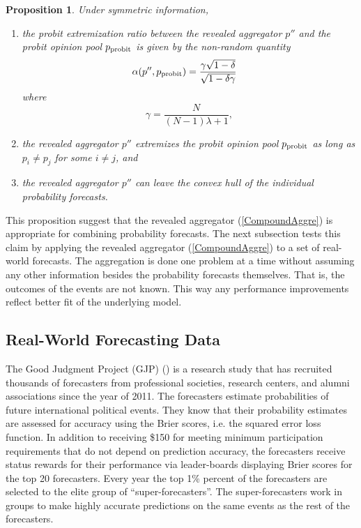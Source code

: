 \documentclass[11pt]{article}
\newtheorem{proposition}[theorem]{Proposition}
\theoremstyle{definition}
\theoremstyle{definition}
\def\probit{p_{\rm probit}}
\begin{document}
\begin{proposition} \label{positiveThm}
Under symmetric information, 
\begin{enumerate}
\item[$(i)$] the probit extremization ratio between the revealed
aggregator $p''$ and the probit opinion pool $\probit$ is given by the
non-random quantity
\begin{align*}
\alpha(p'', \probit)
 &=  \frac{\gamma \sqrt{1 - \delta}}{\sqrt{1-\delta\gamma}}
\end{align*}
where
$$\gamma = \frac{N}{(N-1)\lambda +1},$$
\item[$(ii)$] the revealed aggregator $p''$ extremizes the probit
opinion pool $\probit$ as long as $p_i \neq p_j$ for some $i \neq j$,
and
\item[$(iii)$] the revealed aggregator $p''$ can leave the convex hull
of the individual probability forecasts.
\end{enumerate}
\end{proposition}
This proposition suggest that the revealed aggregator
(\ref{CompoundAggre}) is appropriate for combining probability
forecasts. The next subsection tests this claim by applying the revealed aggregator (\ref{CompoundAggre}) to a set
of real-world forecasts. The aggregation is done one problem at a time
without assuming any other information besides the probability
forecasts themselves. That is, the outcomes of the events are not
known. This way any performance improvements reflect better fit of the
underlying model.



\subsection{Real-World Forecasting Data}
\label{realData}
The Good Judgment Project (GJP) (\citealt{mellers2014psychological,
ungar2012good}) is a research study that has recruited
thousands of forecasters from professional societies, research
centers, and alumni associations since the year of 2011.  The forecasters estimate
probabilities of future international political events.  They know that their
probability estimates are assessed for accuracy using the Brier scores, i.e. the
squared error loss function.  In addition to receiving \$150 for
meeting minimum participation requirements that do not depend on
prediction accuracy, the forecasters receive status rewards for their
performance via leader-boards displaying Brier scores for the top 20
forecasters.  Every year the top 1\% percent of the forecasters are
selected to the elite group of ``super-forecasters''. The
super-forecasters work in groups to make highly accurate predictions
on the same events as the rest of the forecasters.
\end{document}

